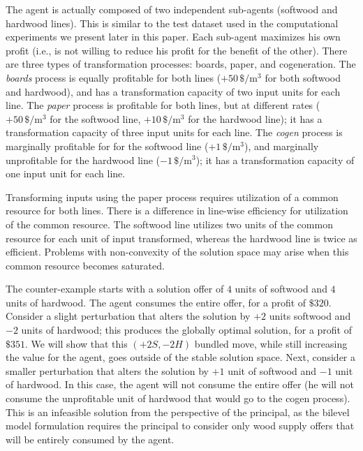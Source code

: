 The agent is actually composed of two independent sub-agents (softwood and hardwood lines). 
This is similar to the test dataset used in the computational experiments we present later in this paper.
Each sub-agent maximizes his own profit (i.e., is not willing to reduce his profit for the benefit of the other).
There are three types of transformation processes: boards, paper, and cogeneration.
The \emph{boards} process is equally profitable for both lines ($+50\,\si{\$\per\cubic\metre}$ for both softwood and hardwood), and has a transformation capacity of two input units for each line.
The \emph{paper} process is profitable for both lines, but at different rates ($+50\,\si{\$\per\cubic\metre}$ for the softwood line, $+10\,\si{\$\per\cubic\metre}$ for the hardwood line); it has a transformation capacity of three input units for each line.
The \emph{cogen} process is marginally profitable for for the softwood line ($+1\,\si{\$\per\cubic\metre}$), and marginally unprofitable for the hardwood line ($-1\,\si{\$\per\cubic\metre}$); it has a transformation capacity of one input unit for each line.

Transforming inputs using the paper process requires utilization of a common resource for both lines.
There is a difference in line-wise efficiency for utilization of the common resource.
The softwood line utilizes two units of the common resource for each unit of input transformed, whereas the hardwood line is twice as efficient.
Problems with non-convexity of the solution space may arise when this common resource becomes saturated.

The counter-example starts with a solution offer of $4$ units of softwood and $4$ units of hardwood.
The agent consumes the entire offer, for a profit of $\$320$. 
Consider a slight perturbation that alters the solution by $+2$ units softwood and $-2$ units of hardwood; this produces the globally optimal solution, for a profit of $\$351$. 
We will show that this $(+2S,-2H)$ bundled move, while still increasing the value for the agent, goes outside of the stable solution space.
Next, consider a smaller perturbation that alters the solution by $+1$ unit of softwood and $-1$ unit of hardwood.
In this case, the agent will not consume the entire offer (he will not consume the unprofitable unit of hardwood that would go to the cogen process).
This is an infeasible solution from the perspective of the principal, as the bilevel model formulation requires the principal to consider only wood supply offers that will be entirely consumed by the agent.

